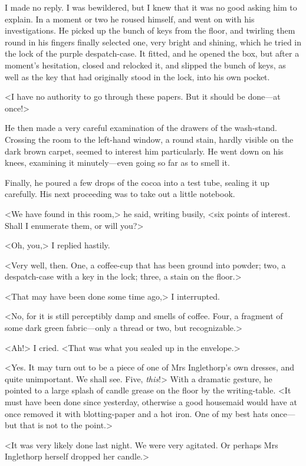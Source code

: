  I made no reply. I was bewildered, but I knew that it was no good asking him to explain. In a moment or two he roused himself, and went on with his investigations. He picked up the bunch of keys from the floor, and twirling them round in his fingers finally selected one, very bright and shining, which he tried in the lock of the purple despatch-case. It fitted, and he opened the box, but after a moment's hesitation, closed and relocked it, and slipped the bunch of keys, as well as the key that had originally stood in the lock, into his own pocket. 

 <I have no authority to go through these papers. But it should be done—at once!> 

 He then made a very careful examination of the drawers of the wash-stand. Crossing the room to the left-hand window, a round stain, hardly visible on the dark brown carpet, seemed to interest him particularly. He went down on his knees, examining it minutely—even going so far as to smell it. 

 Finally, he poured a few drops of the cocoa into a test tube, sealing it up carefully. His next proceeding was to take out a little notebook. 

 <We have found in this room,> he said, writing busily, <six points of interest. Shall I enumerate them, or will you?> 

 <Oh, you,> I replied hastily. 

 <Very well, then. One, a coffee-cup that has been ground into powder; two, a despatch-case with a key in the lock; three, a stain on the floor.> 

 <That may have been done some time ago,> I interrupted. 

 <No, for it is still perceptibly damp and smells of coffee. Four, a fragment of some dark green fabric—only a thread or two, but recognizable.> 

 <Ah!> I cried. <That was what you sealed up in the envelope.> 

 <Yes. It may turn out to be a piece of one of Mrs Inglethorp's own dresses, and quite unimportant. We shall see. Five, \emph{this}!> With a dramatic gesture, he pointed to a large splash of candle grease on the floor by the writing-table. <It must have been done since yesterday, otherwise a good housemaid would have at once removed it with blotting-paper and a hot iron. One of my best hats once—but that is not to the point.> 

 <It was very likely done last night. We were very agitated. Or perhaps Mrs Inglethorp herself dropped her candle.> 

